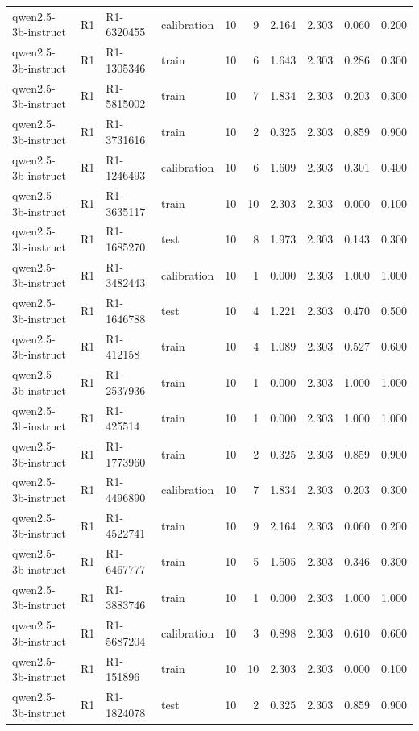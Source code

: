 \begin{table}
\begin{tabular}{llllrrrrrr}
qwen2.5-3b-instruct & R1 & R1-6320455 & calibration & 10 & 9 & 2.164 & 2.303 & 0.060 & 0.200 \\
qwen2.5-3b-instruct & R1 & R1-1305346 & train & 10 & 6 & 1.643 & 2.303 & 0.286 & 0.300 \\
qwen2.5-3b-instruct & R1 & R1-5815002 & train & 10 & 7 & 1.834 & 2.303 & 0.203 & 0.300 \\
qwen2.5-3b-instruct & R1 & R1-3731616 & train & 10 & 2 & 0.325 & 2.303 & 0.859 & 0.900 \\
qwen2.5-3b-instruct & R1 & R1-1246493 & calibration & 10 & 6 & 1.609 & 2.303 & 0.301 & 0.400 \\
qwen2.5-3b-instruct & R1 & R1-3635117 & train & 10 & 10 & 2.303 & 2.303 & 0.000 & 0.100 \\
qwen2.5-3b-instruct & R1 & R1-1685270 & test & 10 & 8 & 1.973 & 2.303 & 0.143 & 0.300 \\
qwen2.5-3b-instruct & R1 & R1-3482443 & calibration & 10 & 1 & 0.000 & 2.303 & 1.000 & 1.000 \\
qwen2.5-3b-instruct & R1 & R1-1646788 & test & 10 & 4 & 1.221 & 2.303 & 0.470 & 0.500 \\
qwen2.5-3b-instruct & R1 & R1-412158 & train & 10 & 4 & 1.089 & 2.303 & 0.527 & 0.600 \\
qwen2.5-3b-instruct & R1 & R1-2537936 & train & 10 & 1 & 0.000 & 2.303 & 1.000 & 1.000 \\
qwen2.5-3b-instruct & R1 & R1-425514 & train & 10 & 1 & 0.000 & 2.303 & 1.000 & 1.000 \\
qwen2.5-3b-instruct & R1 & R1-1773960 & train & 10 & 2 & 0.325 & 2.303 & 0.859 & 0.900 \\
qwen2.5-3b-instruct & R1 & R1-4496890 & calibration & 10 & 7 & 1.834 & 2.303 & 0.203 & 0.300 \\
qwen2.5-3b-instruct & R1 & R1-4522741 & train & 10 & 9 & 2.164 & 2.303 & 0.060 & 0.200 \\
qwen2.5-3b-instruct & R1 & R1-6467777 & train & 10 & 5 & 1.505 & 2.303 & 0.346 & 0.300 \\
qwen2.5-3b-instruct & R1 & R1-3883746 & train & 10 & 1 & 0.000 & 2.303 & 1.000 & 1.000 \\
qwen2.5-3b-instruct & R1 & R1-5687204 & calibration & 10 & 3 & 0.898 & 2.303 & 0.610 & 0.600 \\
qwen2.5-3b-instruct & R1 & R1-151896 & train & 10 & 10 & 2.303 & 2.303 & 0.000 & 0.100 \\
qwen2.5-3b-instruct & R1 & R1-1824078 & test & 10 & 2 & 0.325 & 2.303 & 0.859 & 0.900 \\

\end{tabular}
\end{table}
